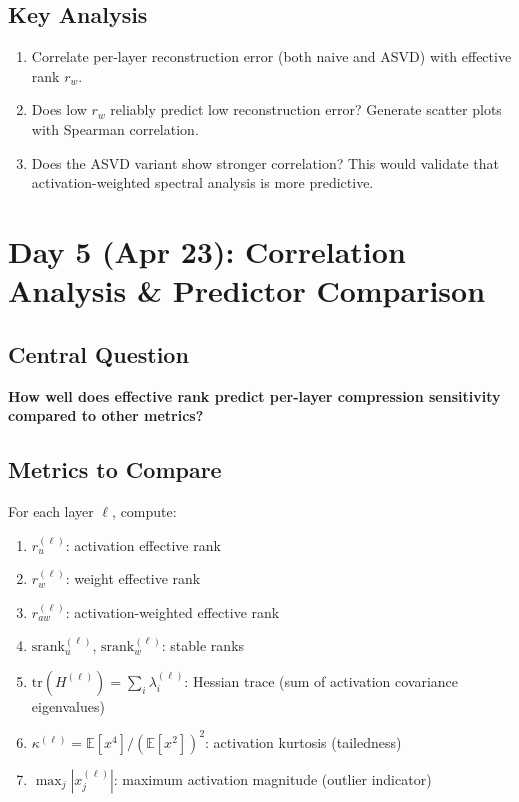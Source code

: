 \documentclass[11pt,a4paper]{article}
\begin{document}
\subsection{Key Analysis}
\begin{enumerate}
    \item Correlate per-layer reconstruction error (both naive and ASVD) with effective rank $r_w$.
    \item Does low $r_w$ reliably predict low reconstruction error? Generate scatter plots with Spearman correlation.
    \item Does the ASVD variant show stronger correlation? This would validate that activation-weighted spectral analysis is more predictive.
\end{enumerate}

\section{Day 5 (Apr 23): Correlation Analysis \& Predictor Comparison}

\subsection{Central Question}
\textbf{How well does effective rank predict per-layer compression sensitivity compared to other metrics?}

\subsection{Metrics to Compare}
For each layer $\ell$, compute:
\begin{enumerate}
    \item $r_u^{(\ell)}$: activation effective rank
    \item $r_w^{(\ell)}$: weight effective rank
    \item $r_{aw}^{(\ell)}$: activation-weighted effective rank
    \item $\text{srank}_u^{(\ell)}$, $\text{srank}_w^{(\ell)}$: stable ranks
    \item $\text{tr}(H^{(\ell)}) = \sum_i \lambda_i^{(\ell)}$: Hessian trace (sum of activation covariance eigenvalues)
    \item $\kappa^{(\ell)} = \mathbb{E}[x^4]/(\mathbb{E}[x^2])^2$: activation kurtosis (tailedness)
    \item $\max_j |x_j^{(\ell)}|$: maximum activation magnitude (outlier indicator)
\end{enumerate}
\end{document}
